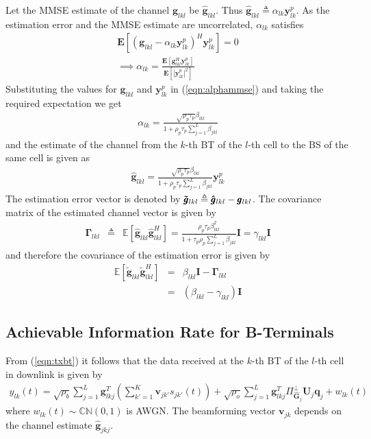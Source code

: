 \documentclass[10pt, a4paper, twoside,fleqn]{article}
\begin{document}
Let the MMSE estimate of the channel $\pmb{g}_{lkl}$ be $\pmb{\hat g}_{lkl}$. Thus $\pmb{\hat g}_{lkl} \triangleq \alpha_{lk}\pmb{y}_{lk}^{p}$. As the estimation error and the MMSE estimate are uncorrelated, $\alpha_{lk}$ satisfies
\begin{eqnarray}\label{eqn:alphammse}
	\pmb{E}[(\pmb{g}_{lkl}-\alpha_{lk}\pmb{y}_{lk}^{p})^H \pmb{y}_{lk}^{p}] = 0 \nonumber \\
	\implies \alpha_{lk} = \frac{\pmb{E}[\pmb{g}^{H}_{lkl} \pmb{y}_{lk}^{p}]}{\pmb{E}[|\pmb{y}_{lk}^{p}|^2]}
\end{eqnarray}
Substituting the values for $\pmb{g}_{lkl}$ and $\pmb{y}_{lk}^{p}$ in (\ref{eqn:alphammse}) and taking the required expectation we get
\begin{eqnarray}\label{eq:alphapll}
	\alpha_{lk}=\frac{\sqrt{\rho_p \tau_p} \beta_{lkl}}{1+\rho_p\tau_p\sum\limits_{j=1}^{L}\beta_{jkl}}
\end{eqnarray}
and the estimate of the channel from the $k$-th BT of the $l$-th cell to the BS of the same cell is given as
\begin{eqnarray}\label{eq:estimatehpll}
	\pmb{\hat g}_{lkl} = \frac{\sqrt{\rho_p\tau_p}\beta_{lkl}}{1+\rho_p\tau_p\sum\limits_{j=1}^{L}\beta_{jkl}} \pmb{y}_{lk}^{p}
\end{eqnarray}
The estimation error vector is denoted by ${\pmb{\Tilde g}_{lkl}}  \triangleq  \pmb{{\hat g}}_{lkl} - \pmb{g}_{lkl}$.
The covariance matrix of the estimated channel vector is given by
\begin{eqnarray}
	\pmb{\Gamma}_{lkl} &\triangleq & \mathbb{E}[\pmb{\hat g}_{lkl}\pmb{\hat g}^H_{lkl}]
                    =       \frac{\rho_p\tau_p\beta^2_{lkl}}{1+\tau_p\rho_p\sum\limits_{j=1}^{L}\beta_{jkl}}\pmb{I} = \gamma_{lkl}\pmb{I}
\end{eqnarray}
and therefore the covariance of the estimation error is given by
\begin{eqnarray}
    \mathbb{E}[\pmb{\widetilde{g}}_{lkl} \pmb{\widetilde{g}}^H_{lkl}] &=& \beta_{lkl}\pmb{I}-\pmb{\Gamma}_{lkl} \nonumber \\
          									    &=& (\beta_{lkl} - \gamma_{lkl})\pmb{I}
\end{eqnarray}

\subsection{Achievable Information Rate for B-Terminals}
From (\ref{eqn:txbt}) it follows that the data received at the $k$-th BT of the $l$-th cell in downlink is given by
\begin{eqnarray}\label{eq:ot}
 	y_{lk}(t) = \sqrt{\rho_b}\sum_{j=1}^{L} \pmb{g}_{lkj}^{T} \left(\sum_{k'=1}^{K}\pmb{v}_{jk'}s_{jk'}(t)\right)
 		      + \sqrt{\rho_o}\sum_{j=1}^{L}\pmb{g}^T_{lkj} \Pi^{\perp}_{{\pmb{\hat{G}}_j}} \pmb{U}_j\pmb{q}_{j}+ w_{lk}(t)
\end{eqnarray} 
where $w_{lk}(t) \sim {\mathbb C}{\mathbb N}(0,1)$  is AWGN. The beamforming vector $\pmb{v}_{jk}$ depends on the channel estimate $\pmb{\hat g}_{jkj}$.
\end{document}
